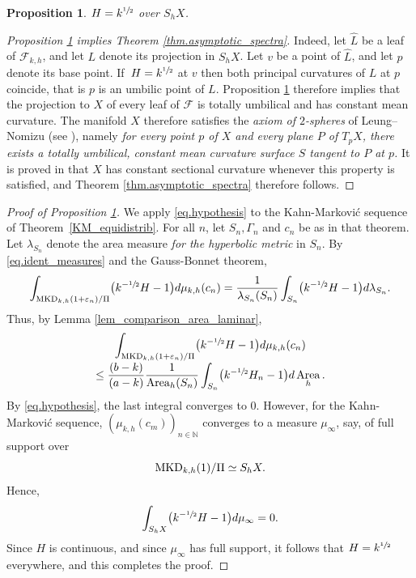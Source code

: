 \documentclass[11pt]{article}
\theoremstyle{plain}
\newtheorem{prop}[theorem]{Proposition}
\theoremstyle{definition}
\newcommand{\cF}{{\mathcal F}}
\let\eps\varepsilon
\newcommand{\MKD}{\mathrm{MKD}}
\DeclareMathOperator{\Area}{Area}
\begin{document}
\begin{prop}\label{p.tot_asymptotic}
$H=k^{\sfrac{1}{2}}$ over $S_hX$.
\end{prop}

\begin{proof}[Proposition \ref{p.tot_asymptotic} implies Theorem \ref{thm.asymptotic_spectra}]
Indeed, let $\hat L$ be a leaf of $\cF_{k,h}$, and let $L$ denote its projection in $S_hX$. Let $v$ be a point of $\hat L$, and let $p$ denote its base point. If~$H=k^{\sfrac{1}{2}}$ at $v$ then both principal curvatures of $L$ at $p$ coincide, that is $p$ is an umbilic point of $L$. Proposition \ref{p.tot_asymptotic} therefore implies that the projection to $X$ of every leaf of $\cF$ is totally umbilical and has constant mean curvature. The manifold $X$ therefore satisfies the \emph{axiom of $2$-spheres} of Leung--Nomizu (see \cite{Leung_Nomizu}), namely \emph{for every point $p$ of $X$ and every plane $P$ of $T_pX$, there exists a totally umbilical, constant mean curvature surface $S$ tangent to $P$ at $p$.} It is proved in \cite{Leung_Nomizu} that $X$ has constant sectional curvature whenever this property is satisfied, and Theorem \ref{thm.asymptotic_spectra} therefore follows.
\end{proof}

\begin{proof}[Proof of Proposition \ref{p.tot_asymptotic}] We apply \eqref{eq.hypothesis} to the Kahn-Markovi\'c sequence of Theo\-rem~\ref{KM_equidistrib}. For all $n$, let $S_n,\Gamma_n$ and $c_n$ be as in that theorem. Let $\lambda_{S_n}$ denote the area measure \emph{for the hyperbolic metric} in $S_n$. By \eqref{eq.ident_measures} and the Gauss-Bonnet theorem,
\begin{equation*}
\int_{\MKD_{k,h}(1+\eps_n)/\Pi}\bigl(k^{-\sfrac{1}{2}}H-1\bigr)d\mu_{k,h}(c_n)=
\frac{1}{\lambda_{S_n}(S_n)}\int_{S_n}\bigl(k^{-\sfrac{1}{2}}H-1\bigr)d\lambda_{S_n}.
\end{equation*}
Thus, by Lemma \ref{lem_comparison_area_laminar},\vspace*{-3pt}
\begin{multline*}
\int_{\MKD_{k,h}(1+\eps_n)/\Pi}\bigl(k^{-\sfrac{1}{2}}H-1\bigr)d\mu_{k,h}(c_n)\\[-3pt]
\leq\frac{(b-k)}{(a-k)}\frac{1}{\Area_h(S_n)}\int_{S_n}\bigl(k^{-\sfrac{1}{2}}H_n-1\bigr)d\Area_h.
\end{multline*}
By \eqref{eq.hypothesis}, the last integral converges to $0$. However, for the Kahn-Markovi\'c sequence, $(\mu_{k,h}(c_m))_{n\in\mathbb{N}}$ converges to a measure $\mu_\infty$, say, of full support over
\[
\MKD_{k,h}(1)/\Pi\simeq\nobreak S_hX.
\]
Hence,
\begin{equation*}
\int_{S_hX}\bigl(k^{-\sfrac{1}{2}}H-1\bigr)d\mu_\infty = 0.
\end{equation*}
Since $H$ is continuous, and since $\mu_\infty$ has full support, it follows that $H=k^{\sfrac{1}{2}}$ everywhere, and this completes the proof.
\end{proof}
\end{document}

